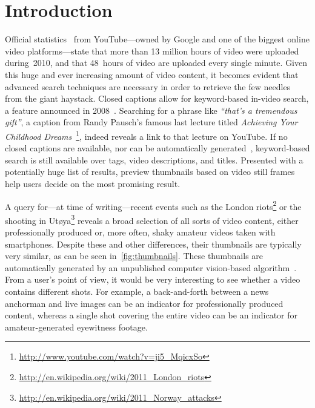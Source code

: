 \documentclass[runningheads,a4paper]{llncs}
\begin{document}
\section{Introduction}
Official statistics~\cite{youtube:stats} from YouTube---owned by Google and one of the biggest online video platforms---state that more than 13 million hours of video were uploaded during~2010, and that 48~hours of video are uploaded every single minute. Given this huge and ever increasing amount of video content, it becomes evident that advanced search techniques are necessary in order to retrieve the few needles from the giant haystack. Closed captions allow for keyword-based in-video search, a feature announced \linebreak in 2008~\cite{googlevideo}. Searching for a phrase like \emph{``that's a tremendous gift''}, a caption from Randy Pausch's famous last lecture titled \emph{Achieving Your Childhood Dreams}~\footnote{\url{http://www.youtube.com/watch?v=ji5\_MqicxSo}}, indeed reveals a link to that lecture on YouTube. If no closed captions are available, nor can be automatically generated~\cite{youtubecaptions}, keyword-based search is still available over tags, video descriptions, and titles. Presented with a potentially huge list of results, preview thumbnails based on video still frames help users decide on the most promising result.

A query for---at time of writing---recent events such as the London riots\footnote{\url{http://en.wikipedia.org/wiki/2011_London_riots}} or the shooting in Ut\o ya\footnote{\url{http://en.wikipedia.org/wiki/2011_Norway_attacks}} reveals a broad selection of all sorts of video content, either professionally produced or, more often, shaky amateur videos taken with smartphones. Despite these and other differences, their thumbnails are typically very similar, as can be seen in~\autoref{fig:thumbnails}. These thumbnails are automatically generated by an unpublished computer vision-based algorithm~\cite{googleresearch}. From a user's point of view, it would be very interesting to see whether a video contains different shots. For example, a back-and-forth between a news anchorman and live images can be an indicator for professionally  produced content, whereas a single shot covering the entire video can be an indicator for amateur-generated eyewitness footage.
\end{document}
